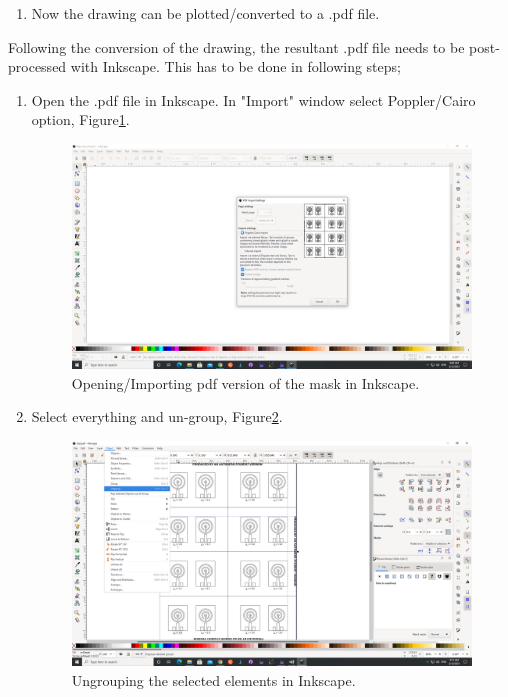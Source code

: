 \begin{enumerate}
	\item Now the drawing can be plotted/converted to a .pdf file.
	
\end{enumerate}

Following the conversion of the drawing, the resultant .pdf file needs to be post-processed with Inkscape.
This has to be done in following steps;

\begin{enumerate}
	
	\item Open the .pdf file in Inkscape. In "Import" window select Poppler/Cairo option,
	Figure\ref{fig:OpenPdfInkscape}.
	
	\begin{figure}[H]
		\centering
		\includegraphics[angle=0,origin=c,width = .8\linewidth]{Section_ODMR_Antenna/Figures/OpenPdfInkscape.png}
		\caption{Opening/Importing pdf version of the mask in Inkscape.}
		\label{fig:OpenPdfInkscape}
	\end{figure}
	
	
	\item Select everything and un-group, Figure\ref{fig:SelectUngroup}.

	\begin{figure}[H]
		\centering
		\includegraphics[angle=0,origin=c,width = .8\linewidth]{Section_ODMR_Antenna/Figures/SelectUngroup.png}
		\caption{Ungrouping the selected elements in Inkscape.}
		\label{fig:SelectUngroup}
	\end{figure}
	

\end{enumerate}

